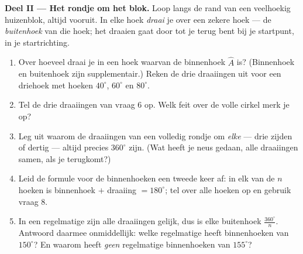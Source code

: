 \begin{problem}
\medskip
\noindent\textbf{Deel II --- Het rondje om het blok.}
Loop langs de rand van een veelhoekig huizenblok, altijd vooruit. In elke hoek
\emph{draai} je over een zekere hoek --- de \emph{buitenhoek} van die hoek; het
draaien gaat door tot je terug bent bij je startpunt, in je startrichting.
\begin{enumerate}[resume]
  \item Over hoeveel draai je in een hoek waarvan de binnenhoek $\widehat A$ is?
        (Binnenhoek en buitenhoek zijn supplementair.) Reken de drie draaiingen uit
        voor een driehoek met hoeken $40^\circ$, $60^\circ$ en $80^\circ$.
  \item Tel de drie draaiingen van vraag 6 op. Welk feit over de volle cirkel merk
        je op?
  \item Leg uit waarom de draaiingen van een volledig rondje om \emph{elke}
         --- drie zijden of dertig --- altijd precies $360^\circ$ zijn.
        (Wat heeft je neus gedaan, alle draaiingen samen, als je terugkomt?)
  \item Leid de formule voor de binnenhoeken een tweede keer af: in elk van de $n$
        hoeken is binnenhoek $+$ draaiing $= 180^\circ$; tel over alle hoeken op en
        gebruik vraag 8.
  \item In een regelmatige  zijn alle draaiingen gelijk, dus is elke
        buitenhoek $\frac{360^\circ}{n}$. Antwoord daarmee onmiddellijk: welke
        regelmatige  heeft binnenhoeken van $150^\circ$? En waarom heeft
        \emph{geen} regelmatige  binnenhoeken van $155^\circ$?
\end{enumerate}


\end{problem}

